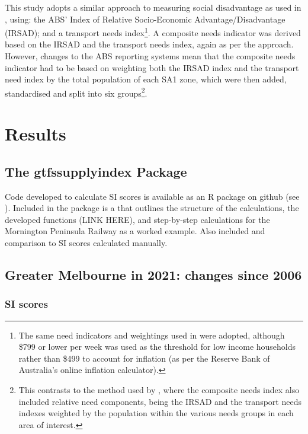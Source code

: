 \documentclass[preprint, 3p,
authoryear]{elsarticle} %
\begin{document}
This study adopts a similar approach to measuring social disadvantage as
used in \citet{currie2010identifying}, using: the ABS' Index of Relative
Socio-Economic Advantage/Disadvantage (IRSAD); and a transport needs
index\footnote{The same need indicators and weightings used in
  \citet{currie2010identifying} were adopted, although \$799 or lower
  per week was used as the threshold for low income households rather
  than \$499 to account for inflation (as per the Reserve Bank of
  Australia's online inflation calculator).}. A composite needs
indicator was derived based on the IRSAD and the transport needs index,
again as per the \citet{currie2010identifying} approach. However,
changes to the ABS reporting systems mean that the composite needs
indicator had to be based on weighting both the IRSAD index and the
transport need index by the total population of each SA1 zone, which
were then added, standardised and split into six groups\footnote{This
  contrasts to the method used by \citet{currie2010identifying}, where
  the composite needs index also included relative need components,
  being the IRSAD and the transport needs indexes weighted by the
  population within the various needs groups in each area of interest.}.

\section{Results}\label{results}

\subsection{The gtfssupplyindex
Package}\label{the-gtfssupplyindex-package}

Code developed to calculate SI scores is available as an R package on
github (see \citet{gtfssupplyindex_github}). Included in the package is
a that outlines the structure of the calculations, the developed
functions (LINK HERE), and step-by-step calculations for the Mornington
Peninsula Railway as a worked example. Also included and comparison to
SI scores calculated manually.

\subsection{Greater Melbourne in 2021: changes since
2006}\label{greater-melbourne-in-2021-changes-since-2006}

\subsubsection{SI scores}\label{si-scores}
\end{document}
